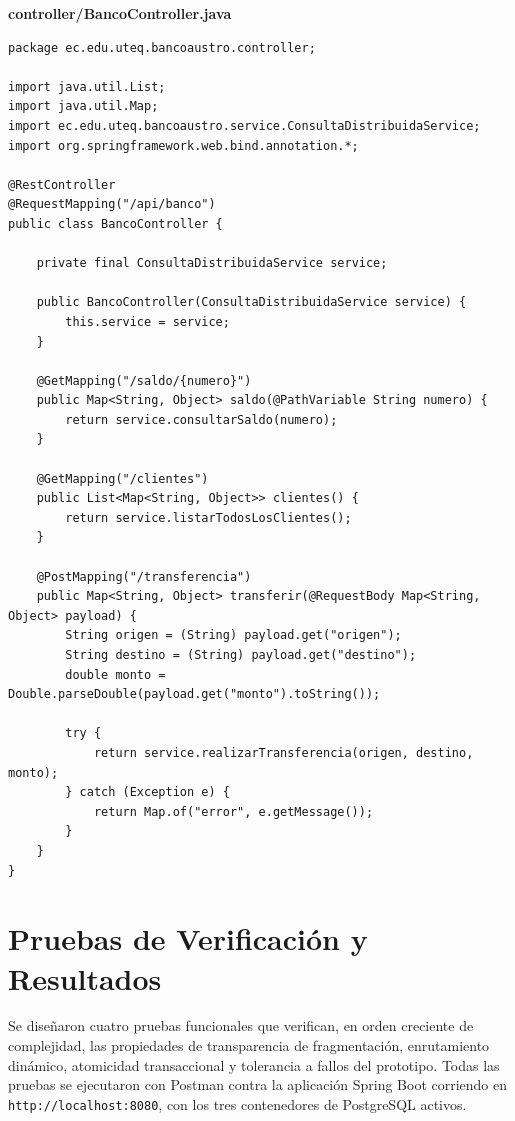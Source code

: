 \documentclass[11pt,a4paper]{article}
\newcommand{\codecaption}[1]{{\ttfamily\small\bfseries\color{acento} #1}\par\vspace{2pt}}
\begin{document}
\codecaption{controller/BancoController.java}
\begin{lstlisting}[style=java]
package ec.edu.uteq.bancoaustro.controller;

import java.util.List;
import java.util.Map;
import ec.edu.uteq.bancoaustro.service.ConsultaDistribuidaService;
import org.springframework.web.bind.annotation.*;

@RestController
@RequestMapping("/api/banco")
public class BancoController {

    private final ConsultaDistribuidaService service;

    public BancoController(ConsultaDistribuidaService service) {
        this.service = service;
    }

    @GetMapping("/saldo/{numero}")
    public Map<String, Object> saldo(@PathVariable String numero) {
        return service.consultarSaldo(numero);
    }

    @GetMapping("/clientes")
    public List<Map<String, Object>> clientes() {
        return service.listarTodosLosClientes();
    }

    @PostMapping("/transferencia")
    public Map<String, Object> transferir(@RequestBody Map<String, Object> payload) {
        String origen = (String) payload.get("origen");
        String destino = (String) payload.get("destino");
        double monto = Double.parseDouble(payload.get("monto").toString());

        try {
            return service.realizarTransferencia(origen, destino, monto);
        } catch (Exception e) {
            return Map.of("error", e.getMessage());
        }
    }
}
\end{lstlisting}

\section{Pruebas de Verificación y Resultados}

Se diseñaron cuatro pruebas funcionales que verifican, en orden creciente de complejidad, las propiedades de transparencia de fragmentación, enrutamiento dinámico, atomicidad transaccional y tolerancia a fallos del prototipo. Todas las pruebas se ejecutaron con Postman contra la aplicación Spring Boot corriendo en \texttt{http://localhost:8080}, con los tres contenedores de PostgreSQL activos.
\end{document}
